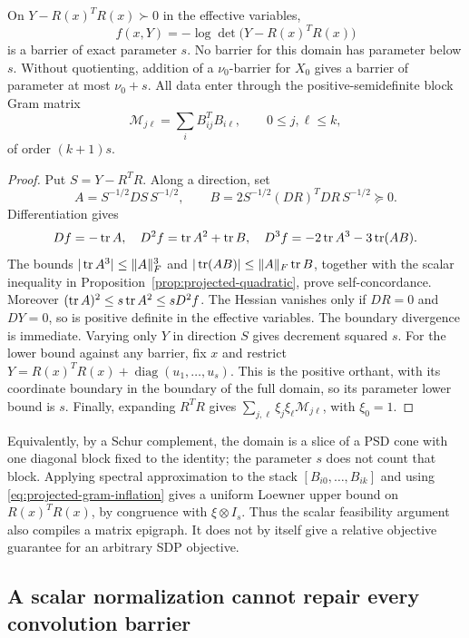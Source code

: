 \begin{proposition}\label{prop:projected-matrix}
On $Y-R(x)^TR(x)\succ0$ in the effective variables,
\[
 f(x,Y)=-\log\det\bigl(Y-R(x)^TR(x)\bigr)
\]
is a barrier of exact parameter $s$.  No barrier for this domain has
parameter below $s$.  Without quotienting, addition of a $\nu_0$-barrier
for $X_0$ gives a barrier of parameter at most $\nu_0+s$.
All data enter through the positive-semidefinite block Gram matrix
\[
 \mathcal M_{j\ell}=\sum_i B_{ij}^TB_{i\ell},\qquad0\leq j,\ell\leq k,
\]
of order $(k+1)s$.
\end{proposition}
\begin{proof}
Put $S=Y-R^TR$.  Along a direction, set
\[
 A=S^{-1/2}DS\,S^{-1/2},\qquad
 B=2S^{-1/2}(DR)^TDR\,S^{-1/2}\succeq0.
\]
Differentiation gives
\[
 Df=-\operatorname{tr} A,\quad D^2f=\operatorname{tr} A^2+\operatorname{tr} B,\quad
 D^3f=-2\operatorname{tr} A^3-3\operatorname{tr}(AB).
\]
The bounds $|\operatorname{tr} A^3|\leq\lVert A\rVert_F^3$ and
$|\operatorname{tr}(AB)|\leq\lVert A\rVert_F\operatorname{tr} B$, together with the scalar inequality
in Proposition~\ref{prop:projected-quadratic}, prove self-concordance.
Moreover $(\operatorname{tr} A)^2\leq s\operatorname{tr} A^2\leq sD^2f$.
The Hessian vanishes only if $DR=0$ and $DY=0$, so is positive definite
in the effective variables.  The boundary divergence is immediate.
Varying only $Y$ in direction $S$ gives decrement squared $s$.
For the lower bound against any barrier, fix $x$ and restrict
$Y=R(x)^TR(x)+\operatorname{diag}(u_1,\ldots,u_s)$.
This is the positive orthant, with its coordinate boundary in the boundary
of the full domain, so its parameter lower bound is $s$.
Finally, expanding $R^TR$ gives
$\sum_{j,\ell}\xi_j\xi_\ell\mathcal M_{j\ell}$, with $\xi_0=1$.
\end{proof}

Equivalently, by a Schur complement, the domain is a slice of a PSD cone
with one diagonal block fixed to the identity; the parameter $s$ does
not count that block.  Applying spectral
approximation to the stack $[B_{i0},\ldots,B_{ik}]$ and using
\eqref{eq:projected-gram-inflation} gives a uniform Loewner upper bound
on $R(x)^TR(x)$, by congruence with $\xi\otimes I_s$.
Thus the scalar feasibility argument also compiles a matrix epigraph.  It does not by itself give a relative
objective guarantee for an arbitrary SDP objective.

\subsection{A scalar normalization cannot repair every convolution barrier}


